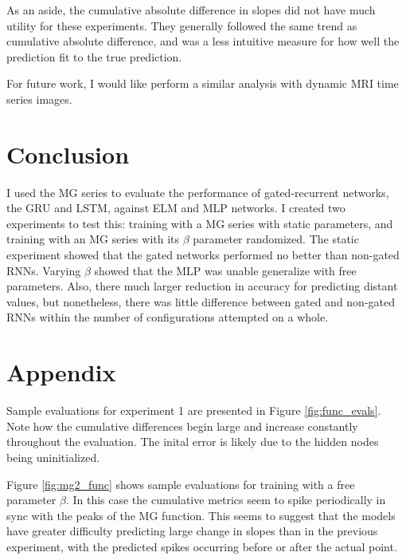 \documentclass[11pt]{article}
\begin{document}
As an aside, the cumulative absolute difference in slopes did not have
much utility for these experiments. They generally followed the same
trend as cumulative absolute difference, and was a less
intuitive measure for how well the prediction fit to the true prediction. %

For future work, I would like perform a similar analysis with dynamic
MRI time series images.

 \section{Conclusion}
I used the MG series to evaluate the performance of gated-recurrent
networks, the GRU and LSTM, against ELM and MLP networks. I created
two  experiments to test this: training with a MG series with
static parameters, and training with an MG series with its $\beta$
parameter randomized. The static experiment showed that the gated
networks performed no better than non-gated RNNs. Varying $\beta$  showed that the MLP was unable generalize with free
parameters. Also, there much larger reduction in accuracy for
predicting distant values, but nonetheless, there was little
difference between gated and non-gated RNNs within the number
of configurations attempted on a whole.
\clearpage



\clearpage
\section*{Appendix}
 Sample evaluations for experiment 1 are presented
  in Figure \ref{fig:func_evals}.  Note how the cumulative
   differences begin large and increase constantly throughout the
   evaluation. The inital error is likely due to the hidden nodes
   being uninitialized.

Figure \ref{fig:mg2_func} shows sample evaluations for training with a
free parameter $\beta$. In this
case the cumulative metrics seem to spike periodically in sync
with the peaks of the MG function. This seems to suggest that the
models have greater difficulty predicting large change in slopes than
in the previous experiment, with the predicted spikes occurring before
or after the actual point. %
\end{document}
